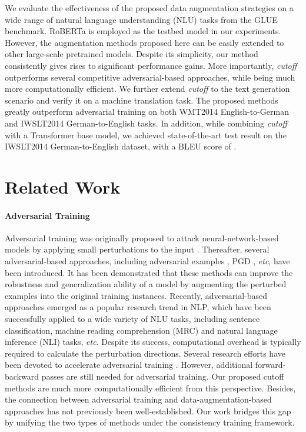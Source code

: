 \documentclass[11pt,a4paper]{article}
\begin{document}
We evaluate the effectiveness of the proposed data augmentation strategies on a wide range of natural language understanding (NLU) tasks from the GLUE benchmark. RoBERTa \cite{liu2019roberta} is employed as the testbed model in our experiments. However, the augmentation methods proposed here can be easily extended to other large-scale pretrained models. 
Despite its simplicity, our method consistently gives rises to significant performance gains.
More importantly, \emph{cutoff} outperforms several competitive adversarial-based approaches, while being much more computationally efficient. We further extend \emph{cutoff} to the text generation scenario and verify it on a machine translation task. The proposed methods greatly outperform adversarial training on both WMT2014 English-to-German and IWSLT2014 German-to-English tasks. In addition, while combining \emph{cutoff} with a Transformer base model, we achieved state-of-the-art test result on the IWSLT2014 German-to-English dataset, with a BLEU score of .
\vspace{-0.5mm}
\section{Related Work}
\vspace{-1mm}
\paragraph{Adversarial Training}
Adversarial training was originally proposed to attack neural-network-based models by applying small perturbations to the input \cite{szegedy2013intriguing}.
Thereafter, several adversarial-based approaches, including adversarial examples \cite{goodfellow2014explaining}, PGD \cite{aleks2017deep}, \emph{etc}, have been introduced. It has been demonstrated that these methods can improve the robustness and generalization ability of a model by augmenting the perturbed examples into the original training instances. Recently, adversarial-based approaches emerged as a popular research trend in NLP, which have been successfully applied to a wide variety of NLU tasks, including sentence classification, machine reading comprehension (MRC) and natural language inference (NLI) tasks, \emph{etc}. Despite its success, computational overhead is typically required to calculate the perturbation directions. Several research efforts have been devoted to accelerate adversarial training \cite{shafahi2019adversarial, zhang2019you}. 
However, additional forward-backward passes are still needed for adversarial training. Our proposed cutoff methods are much more computationally efficient from this perspective. 
Besides, the connection  between adversarial training and data-augmentation-based approaches has not previously been well-established. 
Our work bridges this gap by unifying the two types of methods under the consistency training framework. 
\end{document}
